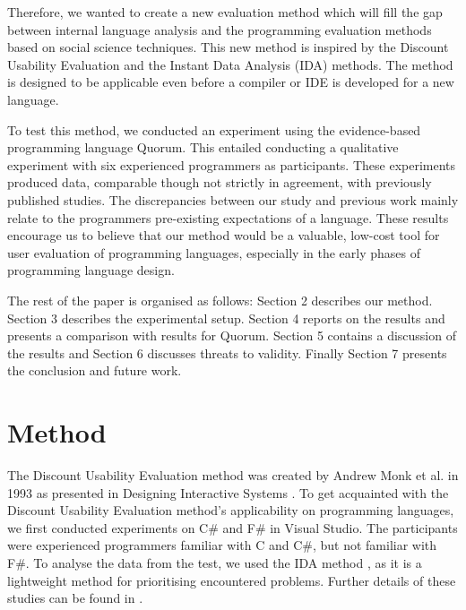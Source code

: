 \documentclass[10pt]{sigplanconf}
\begin{document}
Therefore, we wanted to create a new evaluation method which will fill the gap between 
internal language analysis and the programming evaluation methods based on social science techniques. %
This new method is inspired by the Discount Usability Evaluation and the Instant Data Analysis (IDA) methods. %
The method is designed to be applicable even before a compiler or IDE is developed for a new language.

To test this method, we conducted an experiment using the evidence-based programming language Quorum. This entailed conducting a qualitative experiment with six experienced programmers as participants. These experiments 
produced data, comparable though not strictly in agreement, with previously published studies. The discrepancies between our study and previous work mainly relate to the programmers pre-existing expectations of a language. 
These results encourage us to believe that our method would be a valuable, low-cost tool for user evaluation of programming languages, especially in the early phases of programming language design.


The rest of the paper is organised as follows: Section 2 describes our method. Section 3 describes the experimental setup. Section 4 reports on the results and presents a comparison with results for Quorum. 
Section 5 contains a discussion of the results and Section 6 discusses threats to validity.
Finally Section 7 presents the conclusion and future work.


\section{Method}
The Discount Usability Evaluation method was created by Andrew Monk et al. in 1993 as presented in Designing Interactive Systems \cite{CooperativeEval}.
To get acquainted with the Discount Usability Evaluation method’s applicability on programming languages, we first conducted experiments on C\# and F\# in Visual Studio. The participants were experienced programmers familiar with C and C\#, but not familiar with F\#.  To analyse the data from the test, we used the IDA method \cite{IDA}, as it is a lightweight method for prioritising encountered problems.
Further details of these studies can be found in \cite{thesis}.
\end{document}
